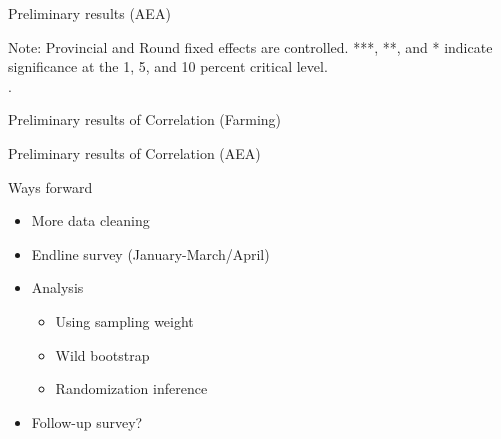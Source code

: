 \documentclass[aspectratio=169]{beamer}
\begin{document}
\begin{frame}{Preliminary results (AEA)}
	\centering
	\scalebox{0.55}{}
	\begin{tablenotes}
		\scriptsize
		\item Note: Provincial and Round fixed effects are controlled. ***, **, and * indicate significance at the 1, 5, and 10 percent critical level.  \\.  
	\end{tablenotes}
	
\end{frame}

\begin{frame}{Preliminary results of Correlation (Farming)}
	\centering
	\scalebox{0.34}{}
	
\end{frame}

\begin{frame}{Preliminary results of Correlation (AEA)}
	\centering
	\scalebox{0.5}{}
	
\end{frame}

\begin{frame}{Ways forward}
\begin{itemize}
	\item More data cleaning
	\item Endline survey (January-March/April)
	\item Analysis 
	\begin{itemize}
		\item Using sampling weight
		\item Wild bootstrap
		\item Randomization inference 
	\end{itemize}
	\item Follow-up survey? 
\end{itemize}
	
\end{frame}
	
\end{document}
